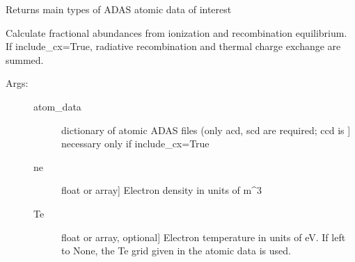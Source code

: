 \documentclass[letterpaper,10pt,english]{sphinxmanual}
\begin{document}

\begin{fulllineitems}
\label{\detokenize{aurora:aurora.atomic.get_file_types}}
Returns main types of ADAS atomic data of interest

\end{fulllineitems}


\begin{fulllineitems}
\label{\detokenize{aurora:aurora.atomic.get_frac_abundances}}
Calculate fractional abundances from ionization and recombination equilibrium.
If include\_cx=True, radiative recombination and thermal charge exchange are summed.
\begin{description}
\item[{Args:}] \leavevmode\begin{description}
\item[{atom\_data}] \leavevmode{[}dictionary of atomic ADAS files (only acd, scd are required; ccd is {]}
necessary only if include\_cx=True

\item[{ne}] \leavevmode{[}float or array{]}
Electron density in units of m\textasciicircum{}\sphinxhyphen{}3

\item[{Te}] \leavevmode{[}float or array, optional{]}
Electron temperature in units of eV. If left to None, the Te grid given in the 
atomic data is used.


\end{description}
\end{description}
\end{fulllineitems}
\end{document}
